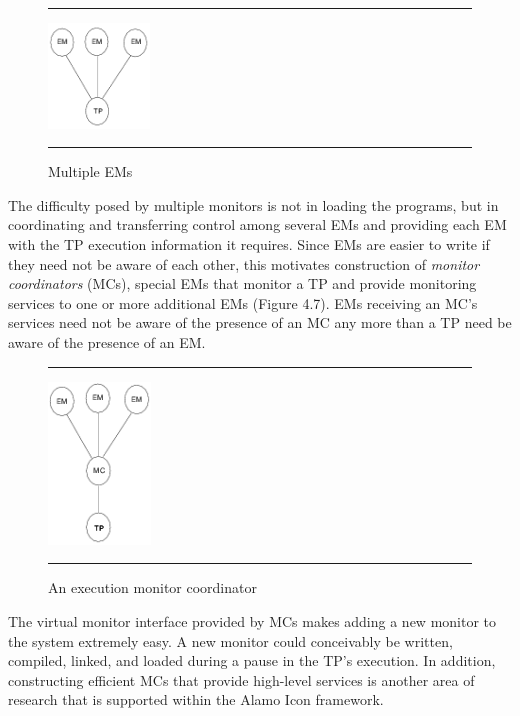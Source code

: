 \begin{figure}[tb]
\hrule\bigskip
\centering

\hspace{0.05in}\includegraphics[height=1.1in]{multiems.png}

\caption{Multiple EMs}
\medskip\hrule
\vspace{12pt}
\end{figure}

The difficulty posed by multiple monitors is not in loading the
programs, but in coordinating and transferring control among several
EMs and providing each EM with the TP execution information it
requires.  Since EMs are easier to write if they need not be aware of
each other, this motivates construction of {\em monitor coordinators\/}
(MCs), special EMs that monitor a TP and provide monitoring services
to one or more additional EMs (Figure 4.7).  EMs receiving an MC's
services need not be aware of the presence of an MC any more than a TP
need be aware of the presence of an EM.

\begin{figure}[tb]
\hrule\bigskip
\centering

\hspace{0.05in}\includegraphics[height=1.7in]{mcover.png}

\caption{An execution monitor coordinator}
\medskip\hrule
\vspace{12pt}
\end{figure}

The virtual monitor interface provided by MCs makes adding a new monitor to
the system extremely easy.  A new monitor could conceivably be written,
compiled, linked, and loaded during a pause in the TP's execution. In
addition, constructing efficient MCs that provide high-level services is
another area of research that is supported within the Alamo Icon framework.

